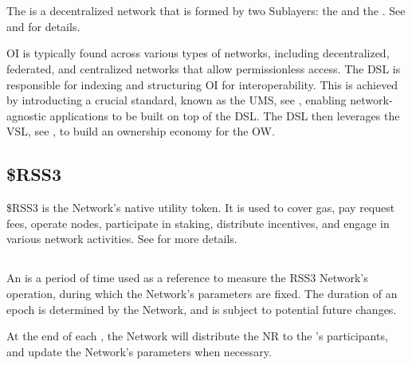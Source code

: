 \section{}

The  is a decentralized network that is formed by two Sublayers: the  and the . See  and  for details.

\gls{OI} is typically found across various types of networks, including decentralized, federated, and centralized networks that allow permissionless access.
The \gls{DSL} is responsible for indexing and structuring \gls{OI} for interoperability.
This is achieved by introducting a crucial standard, known as the \gls{UMS}, see , enabling network-agnostic applications to be built on top of the \gls{DSL}.
The \gls{DSL} then leverages the \gls{VSL}, see , to build an ownership economy for the \gls{OW}.

\subsection{\$RSS3}
\$RSS3 is the Network's native utility token. It is used to cover gas, pay request fees, operate nodes, participate in staking, distribute incentives, and engage in various network activities. See  for more details.

\subsection{}

An  is a period of time used as a reference to measure the RSS3 Network’s operation, during which the Network's parameters are fixed.
The duration of an epoch is determined by the Network, and is subject to potential future changes.

At the end of each \epoch, the Network will distribute the \gls{NR} to the 's participants, and update the Network's parameters when necessary.